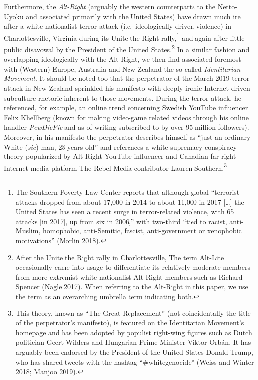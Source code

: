 \documentclass[10pt,british,A4paper,oneside]{memoir}
\begin{document}
Furthermore, the \emph{Alt-Right} (arguably the western counterparts to
the Netto-Uyoku and associated primarily with the United States) have
drawn much ire after a white nationalist terror attack
(i.e.~ideologically driven violence) in Charlottesville, Virginia during
its Unite the Right rally,\footnote{The Southern Poverty Law Center
  reports that although global ``terrorist attacks dropped from about
  17,000 in 2014 to about 11,000 in 2017 {[}\ldots{}{]} the United
  States has seen a recent surge in terror-related violence, with 65
  attacks {[}in 2017{]}, up from six in 2006,'' with two-third ``tied to
  racist, anti-Muslim, homophobic, anti-Semitic, fascist,
  anti-government or xenophobic motivations'' (Morlin
  \protect\hyperlink{ref-morlin_study_2018}{2018}).} and again after
little public disavowal by the President of the United States.\footnote{After
  the Unite the Right rally in Charlottesville, The term Alt-Lite
  occasionally came into usage to differentiate its relatively moderate
  members from more extremist white-nationalist Alt-Right members such
  as Richard Spencer (Nagle
  \protect\hyperlink{ref-nagle_kill_2017}{2017}). When referring to the
  Alt-Right in this paper, we use the term as an overarching
  umbrella term indicating both.} In a similar fashion and overlapping
ideologically with the Alt-Right, we then find associated foremost with
(Western) Europe, Australia and New Zealand the so-called
\emph{Identitarian Movement}. It should be noted too that the
perpetrator of the March 2019 terror attack in New Zealand sprinkled his
manifesto with deeply ironic Internet-driven subculture rhetoric
inherent to those movements. During the terror attack, he referenced, for example, an
online trend concerning Swedish YouTube influencer Felix Khellberg
(known for making video-game related videos through his online handler
\emph{PewDiePie} and as of writing subscribed to by over 95 million
followers). Moreover, in his manifesto the perpetrator describes himself
as ``just an ordinary White (\emph{sic}) man, 28 years old'' and
references a white supremacy conspiracy theory popularized by Alt-Right
YouTube influencer and Canadian far-right Internet media-platform The
Rebel Media contributor Lauren Southern.\footnote{This theory, known as
  ``The Great Replacement'' (not coincidentally the title of the
  perpetrator's manifesto), is featured on the Identitarian Movement's
  homepage and has been adopted by populist right-wing figures such as
  Dutch politician Geert Wilders and Hungarian Prime Minister Viktor
  Orbán. It has arguably been endorsed by the President of the United
  States Donald Trump, who has shared tweets with the hashtag
  ``\#whitegenocide'' (Weiss and Winter
  \protect\hyperlink{ref-weiss_opinion_2018}{2018}; Manjoo
  \protect\hyperlink{ref-manjoo_opinion_2019}{2019}).}
\end{document}
